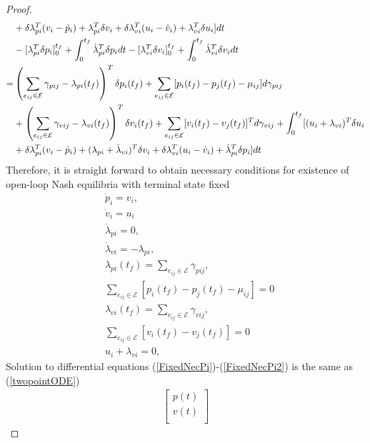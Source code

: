 \documentclass[12pt,draftcls,onecolumn]{IEEEtran}  %
\begin{document}
{\begin{proof}
\begin{align}
&+ \delta \lambda_{pi}^T(v_i-\dot{p}_i)+ \lambda_{pi}^T\delta v_i
+\delta \lambda_{vi}^T(u_i-\dot{v}_i) + \lambda_{vi}^T\delta u_i]\mbox{d}t\notag\\
&-[ \lambda_{pi}^T\delta p_i]_0^{t_f}+\int_{0}^{t_f} \dot{\lambda}^T_{pi}\delta p_{i}\mbox{d}t  -[\lambda_{vi}^T\delta v_i]_{0}^{t_f}+\int_{0}^{t_f} \dot{\lambda}_{vi}^T\delta v_i\mbox{d}t\notag\\
=&\left(\sum_{e_{ij}\in\mathcal{E}}\gamma_{pij} -\lambda_{pi}(t_f)\right)^T\delta p_i(t_f)
+\sum_{e_{ij}\in\mathcal{E}}[ p_i(t_f)-p_j(t_f)-\mu_{ij}]d\gamma_{pij}\notag\\
&+\left(\sum_{e_{ij}\in\mathcal{E}}\gamma_{vij} -\lambda_{vi}(t_f)\right)^T \delta v_i(t_f)+\sum_{e_{ij}\in\mathcal{E}}[ v_i(t_f)-v_j(t_f)]^Td\gamma_{vij}+\int_0^{t_f} [(u_i+\lambda_{vi})^T\delta u_i \notag\\
&+ \delta \lambda_{pi}^T(v_i-\dot{p}_i)+ (\lambda_{pi}+\dot{\lambda}_{vi})^T\delta v_i
+\delta \lambda_{vi}^T(u_i-\dot{v}_i) +\dot{\lambda}_{pi}^T\delta p_i]\mbox{d}t\notag
\end{align}
Therefore, it is straight forward to obtain necessary conditions for existence of open-loop Nash equilibria with terminal state fixed
\begin{subequations}\begin{align}
&\dot{p}_{i}=v_i,\label{FixedNecPi}\\ &\dot{v}_{i}=u_i\label{FixedNecPi1}\\
&\dot{\lambda}_{pi}= 0,\\
&\dot{\lambda}_{vi}= -\lambda_{pi},\label{FixedNecPi2}\\
&\lambda_{pi}(t_f)= \sum_{e_{ij}\in\mathcal{E}}\gamma_{pij}, \label{FixedNecPi3}\\
&\sum_{e_{ij}\in\mathcal{E}} [p_i(t_f)-p_j(t_f)-\mu_{ij}]=0\label{FixedNecPi5}\\
&\lambda_{vi}(t_f)= \sum_{e_{ij}\in\mathcal{E}}\gamma_{vij},\label{FixedNecPi4}\\
&\sum_{e_{ij}\in\mathcal{E}} [v_i(t_f)-v_j(t_f)]=0\label{FixedNecPi6}\\
&u_i+\lambda_{vi} =0,\label{NacUfixed}
\end{align}
\end{subequations}
Solution to differential equations (\ref{FixedNecPi})-(\ref{FixedNecPi2}) is the same as (\ref{twopointODE})
\begin{align}
\begin{bmatrix}
p(t)\\
v(t)\\

\end{bmatrix}
\end{align}
\end{proof}}
\end{document}
